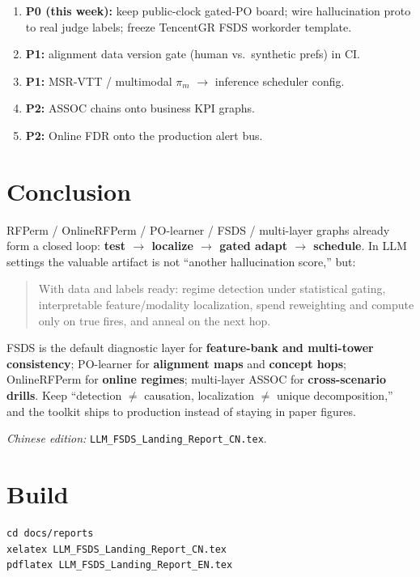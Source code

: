 \documentclass[11pt,a4paper]{article}
\begin{document}
\begin{enumerate}
  \item \textbf{P0 (this week):} keep public-clock gated-PO board; wire hallucination proto to real judge labels; freeze TencentGR FSDS workorder template.
  \item \textbf{P1:} alignment data version gate (human vs.\ synthetic prefs) in CI.
  \item \textbf{P1:} MSR-VTT / multimodal \(\pi_m\) \(\to\) inference scheduler config.
  \item \textbf{P2:} ASSOC chains onto business KPI graphs.
  \item \textbf{P2:} Online FDR onto the production alert bus.
\end{enumerate}

\section{Conclusion}
\label{sec:conclusion}

RFPerm / OnlineRFPerm / PO-learner / FSDS / multi-layer graphs already form a closed loop:
\textbf{test \(\to\) localize \(\to\) gated adapt \(\to\) schedule}.
In LLM settings the valuable artifact is not ``another hallucination score,'' but:

\begin{quote}
With data and labels ready: regime detection under statistical gating, interpretable feature/modality localization, spend reweighting and compute only on true fires, and anneal on the next hop.
\end{quote}

FSDS is the default diagnostic layer for \textbf{feature-bank and multi-tower consistency}; PO-learner for \textbf{alignment maps} and \textbf{concept hops}; OnlineRFPerm for \textbf{online regimes}; multi-layer ASSOC for \textbf{cross-scenario drills}. Keep ``detection \(\neq\) causation, localization \(\neq\) unique decomposition,'' and the toolkit ships to production instead of staying in paper figures.

\vspace{1em}
\noindent\textit{Chinese edition:} \texttt{LLM\_FSDS\_Landing\_Report\_CN.tex}.

\section*{Build}
\begin{verbatim}
cd docs/reports
xelatex LLM_FSDS_Landing_Report_CN.tex
pdflatex LLM_FSDS_Landing_Report_EN.tex
\end{verbatim}
\end{document}
